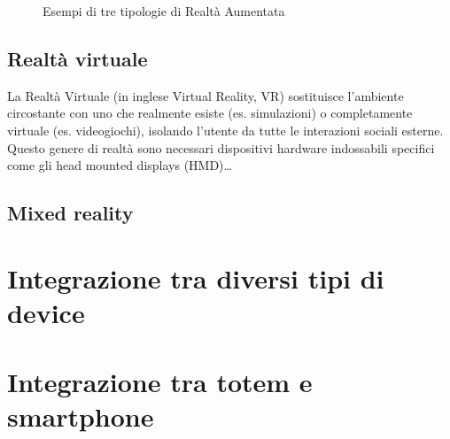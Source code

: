\begin{figure}
    \centering
    \caption{Esempi di tre tipologie di Realtà Aumentata} 
    \label{fig:ARbased_type}
\end{figure}


\subsection{Realtà virtuale}
La Realtà Virtuale (in inglese Virtual Reality, VR) sostituisce l'ambiente circostante con uno che realmente esiste (es. simulazioni) o completamente virtuale (es. videogiochi), isolando l'utente da tutte le interazioni sociali esterne. Questo genere di realtà sono necessari dispositivi hardware indossabili specifici come gli head mounted displays (HMD)\dots

\subsection{Mixed reality}

%
\section{Integrazione tra diversi tipi di device}
\section{Integrazione tra totem e smartphone}
